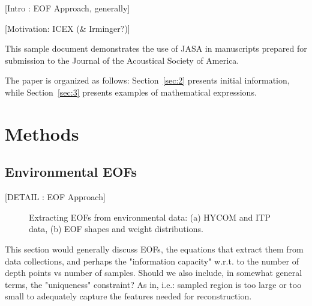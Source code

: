 {\color{red}
[Intro : EOF Approach, generally]

[Motivation: ICEX (\& Irminger?)]
}

This sample document demonstrates the use of JASA in manuscripts
prepared for submission to the Journal of the Acoustical Society of America.

The paper is organized as follows: Section~\ref{sec:2} presents
initial information, while
Section~\ref{sec:3} presents examples of mathematical expressions.



\section{\label{sec:2} Methods}

\subsection{\label{subsec:2:1} Environmental EOFs}

{\color{red}[DETAIL : EOF Approach]}

\begin{figure}[ht]

\caption{\label{fig:FIG1}{Extracting EOFs from environmental data: (a) HYCOM and ITP data, (b) EOF shapes and weight distributions.}}

\end{figure}

This section would generally discuss EOFs, the equations that extract them from data collections, and perhaps the "information capacity" w.r.t. to the number of depth points vs number of samples. Should we also include, in somewhat general terms, the "uniqueness" constraint? As in, i.e.: sampled region is too large or too small to adequately capture the features needed for reconstruction.



